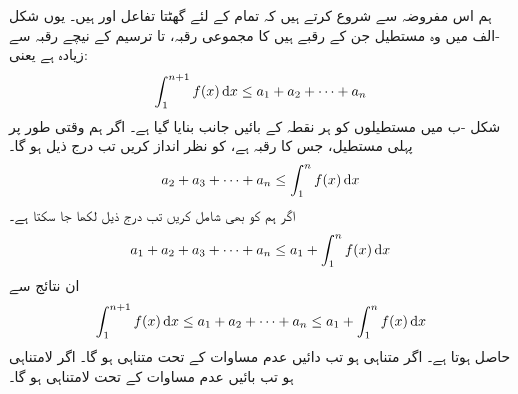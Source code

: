 ہم اس مفروضہ سے شروع کرتے ہیں کہ تمام  کے لئے  گھٹتا تفاعل  اور  ہیں۔ یوں شکل -الف میں وہ مستطیل جن کے رقبے   ہیں کا مجموعی رقبہ،  تا  ترسیم  کے نیچے رقبہ سے زیادہ ہے یعنی:
\begin{align*}
\int_1^{n+1}f(x)\dif x\le a_1+a_2+\cdots+a_n
\end{align*} 
شکل -ب میں مستطیلوں کو ہر نقطہ کے بائیں جانب بنایا گیا ہے۔ اگر ہم وقتی طور پر پہلی مستطیل، جس کا رقبہ  ہے، کو نظر انداز کریں تب درج ذیل ہو گا۔
\begin{align*}
a_2+a_3+\cdots+a_n\le \int_1^nf(x)\dif x
\end{align*}
اگر ہم  کو بھی شامل کریں تب درج ذیل لکھا جا سکتا ہے۔
\begin{align*}
a_1+a_2+a_3+\cdots+a_n\le a_1+\int_1^nf(x)\dif x
\end{align*}
ان نتائج سے 
\begin{align}\label{مساوات_تسلسل_عدم_مساواتیں}
\int_1^{n+1}f(x)\dif x\le a_1+a_2+\cdots+a_n\le  a_1+\int_1^nf(x)\dif x
\end{align}
حاصل ہوتا ہے۔ اگر  متناہی ہو تب دائیں عدم مساوات کے تحت  متناہی ہو گا۔  اگر  لامتناہی ہو تب بائیں عدم مساوات کے تحت  لامتناہی ہو گا۔ 

